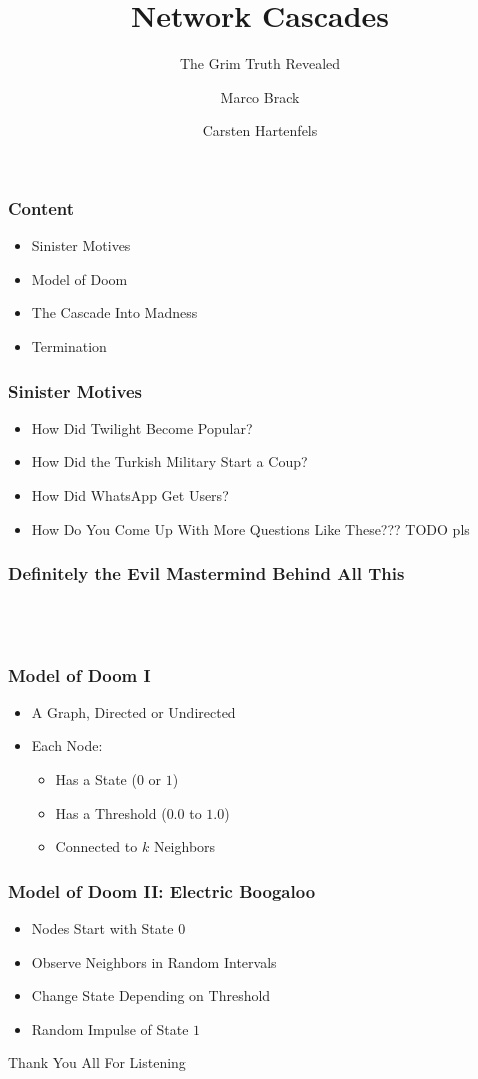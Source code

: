 \documentclass[slidestop,usenames,dvipsnames]{beamer}
\title{Network Cascades}
\subtitle{The Grim Truth Revealed}
\author{Marco Brack \and Carsten Hartenfels}
\newcommand{\fitem}{\pause\vfill\item}
\newcommand{\gitem}{\vfill\item}
\begin{document}
\begin{frame}
    \titlepage
\end{frame}




\begin{frame}
    \frametitle{Content}
    \begin{itemize}
        \gitem Sinister Motives
        \gitem Model of Doom
        \gitem The Cascade Into Madness
        \gitem Termination
    \end{itemize}
    \vfill
\end{frame}


\begin{frame}
    \frametitle{Sinister Motives}
    \begin{itemize}
        \fitem How Did Twilight Become Popular?
        \fitem How Did the Turkish Military Start a Coup?
        \fitem How Did WhatsApp Get Users?
        \fitem How Do You Come Up With More Questions Like These??? TODO pls
    \end{itemize}
    \vfill
\end{frame}

\begin{frame}
    \frametitle{Definitely the Evil Mastermind Behind All This}
    \vfill
    \begin{center}
        \\
        \vspace{20pt}
        \\
        \vspace{20pt}
    \end{center}
    \vfill
\end{frame}

\begin{frame}
    \frametitle{Model of Doom I}
    \begin{itemize}
        \fitem A Graph, Directed or Undirected
        \fitem Each Node:
        \begin{itemize}
            \fitem Has a State ($0$ or $1$)
            \fitem Has a Threshold ($0.0$ to $1.0$)
            \fitem Connected to $k$ Neighbors
        \end{itemize}
    \end{itemize}
    \vfill
\end{frame}

\begin{frame}
    \frametitle{Model of Doom II: Electric Boogaloo}
    \begin{itemize}
        \fitem Nodes Start with State $0$
        \fitem Observe Neighbors in Random Intervals
        \fitem Change State Depending on Threshold
        \fitem Random Impulse of State $1$
    \end{itemize}
    \vfill
\end{frame}




\begin{frame}
    \vfill
    \begin{center}
        {\Huge Thank You All For Listening}\
    \end{center}
\end{frame}
\end{document}
